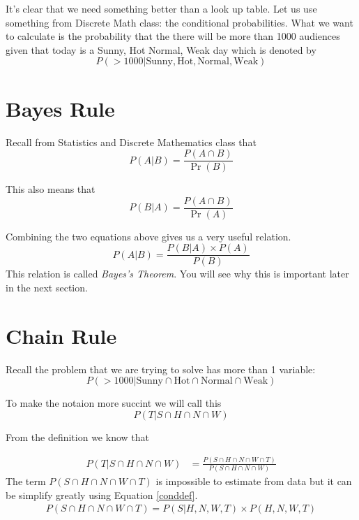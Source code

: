 \documentclass[a4paper, 12pt]{article}
\begin{document}
It's clear that we need something better than a look up table. Let us use something from Discrete Math class: the conditional probabilities. What we want to calculate is the probability that the there will be more than \num{1000} audiences given that today is a Sunny, Hot Normal, Weak day which is denoted by
\begin{equation}
	P( >1000 | \text{Sunny}, \text{Hot}, \text{Normal}, \text{Weak})
\end{equation}

\section*{Bayes Rule}

Recall from Statistics and Discrete Mathematics class that
\begin{equation}
P(A | B) = \frac{P(A \cap B)}{\Pr(B)}
\label{conddef}
\end{equation}

This also means that
\begin{equation}
P(B | A) = \frac{P(A \cap B)}{\Pr(A)} 
\end{equation}

Combining the two equations above gives us a very useful relation.
\begin{equation}
P(A|B) = \frac{P(B|A) \times P(A)}{P(B)}
\label{bayes}
\end{equation}
This relation is called \emph{Bayes's Theorem}. You will see why this is important later in the next section.

\section*{Chain Rule}

Recall the problem that we are trying to solve has more than 1 variable:
\begin{equation}
P( >1000 | \text{Sunny} \cap \text{Hot} \cap \text{Normal} \cap \text{Weak})
\end{equation}

To make the notaion more succint we will call this
\begin{equation}
	P( T | S \cap H \cap N\cap W)
\end{equation}


From the definition we know that

\begin{align}
	P( T | S \cap H \cap N\cap W) &= \frac{P(S \cap H \cap N\cap W \cap T)}{P(S \cap H \cap N\cap W)}
\end{align}
The term $P(S \cap H \cap N\cap W \cap T)$ is impossible to estimate from data but it can be simplify greatly using Equation \ref{conddef}.
\begin{align}
	P(S \cap H \cap N\cap W \cap T) = P(S | H,N,W,T) \times P(H, N, W, T)
\end{align}
\end{document}
